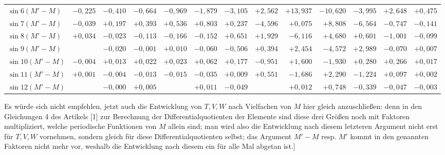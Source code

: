 \begin{landscape}
\begin{longtable}{@{}l|r|r|r|r|r|r|r|r|r|r|r|r@{}}
\(\sin 6(M'-M)\) & \(-0{,}225\) & \(-0{,}410\) & \(-0{,}664\) & \(-0{,}969\) & \(-1{,}879\) & \(-3{,}105\) & \(+2{,}562\) & \(+13{,}937\) & \(-10{,}620\) & \(-3{,}995\) & \(+2{,}648\) & \(+0{,}475\)\\
\(\sin 7(M'-M)\) & \(-0{,}039\) & \(+0{,}197\) & \(+0{,}393\) & \(+0{,}536\) & \(+0{,}803\) & \(+0{,}237\) & \(-4{,}596\) & \(+0{,}075\) & \(+8{,}808\) & \(-6{,}564\) & \(-0{,}747\) & \(-0{,}141\)\\
\(\sin 8(M'-M)\) & \(+0{,}034\) & \(-0{,}023\) & \(-0{,}113\) & \(-0{,}166\) & \(-0{,}152\) & \(+0{,}651\) & \(+1{,}929\) & \(-6{,}116\) & \(+4{,}680\) & \(+0{,}601\) & \(-1{,}001\) & \(-0{,}099\)\\
\(\sin 9(M'-M)\) &  & \(-0{,}020\) & \(-0{,}001\) & \(+0{,}010\) & \(-0{,}060\) & \(-0{,}506\) & \(+0{,}394\) & \(+2{,}454\) & \(-4{,}572\) & \(+2{,}989\) & \(-0{,}070\) & \(+0{,}007\)\\
\(\sin 10(M'-M)\) & \(-0{,}004\) & \(+0{,}013\) & \(+0{,}022\) & \(+0{,}023\) & \(+0{,}062\) & \(+0{,}177\) & \(-0{,}951\) & \(+1{,}600\) & \(-1{,}930\) & \(+0{,}280\) & \(+0{,}266\) & \(+0{,}017\)\\
\(\sin 11(M'-M)\) & \(+0{,}001\) & \(-0{,}004\) & \(-0{,}013\) & \(-0{,}015\) & \(-0{,}035\) & \(+0{,}009\) & \(+0{,}551\) & \(-1{,}686\) & \(+2{,}290\) & \(-1{,}224\) & \(+0{,}097\) & \(+0{,}002\)\\
\(\sin 12(M'-M)\) &  & \(-0{,}000\) & \(+0{,}005\) &  & \(+0{,}011\) & \(-0{,}049\) &  & \(+0{,}012\) & \(+0{,}748\) & \(-0{,}339\) & \(-0{,}047\) & \(-0{,}003\)\\
\end{longtable}
\fontsize{10}{13}\selectfont
Es würde sich nicht empfehlen, jetzt auch die Entwicklung von \(T, V, W\) nach Vielfachen von \(M\)
hier gleich anzuschließen: denn in den Gleichungen 4 des Artikels [1] zur Berechnung der
Differentialquotienten der Elemente sind diese drei Größen noch mit Faktoren multipliziert,
welche periodische Funktionen von \(M\) allein sind; man wird also die Entwicklung nach diesem
letzteren Argument nicht erst für \(T, V, W\) vornehmen, sondern gleich für diese
Differentialquotienten selbst; das Argument \(M'-M\) resp. \(M'\) kommt in den genannten Faktoren
nicht mehr vor, weshalb die Entwicklung nach diesem ein für alle Mal abgetan ist.]
\clearpage
\endgroup
\end{landscape}
